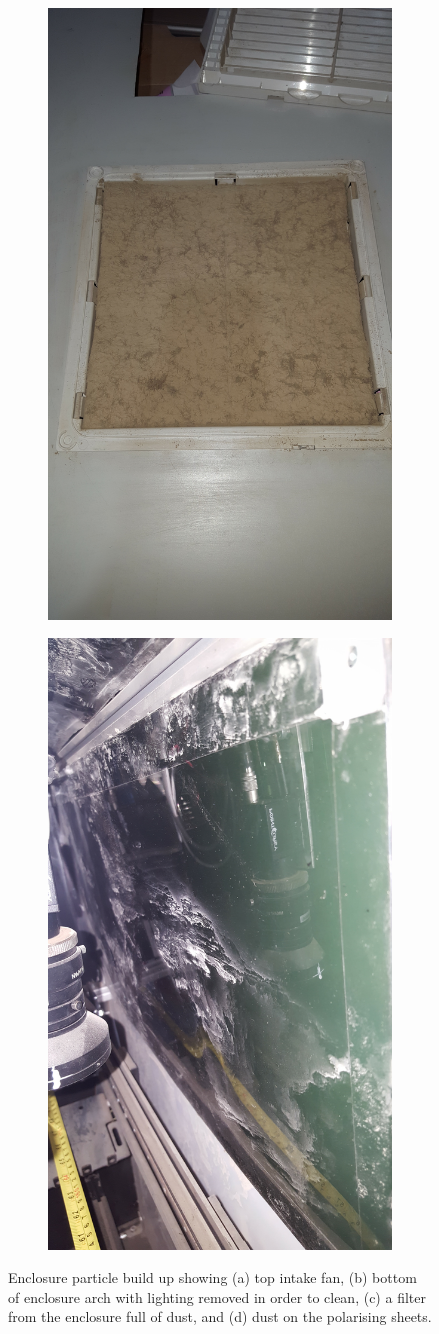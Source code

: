 \documentclass[fleqn,twoside,12pt]{report}
\begin{document}
\begin{figure}[ht]
\begin{subfigure}{.25\textwidth}
		\caption{}
		\label{fig:dirt_2}
	\end{subfigure}%
	\begin{subfigure}{.25\textwidth}
		\centering
		\includegraphics[height=0.9\linewidth,angle=270]{dirt_3.jpg}
		\caption{}
		\label{fig:dirt_3}
	\end{subfigure}%
	\begin{subfigure}{.25\textwidth}
		\centering
		\includegraphics[height=0.9\linewidth,angle=270]{dirt_4.jpg}
		\caption{}
		\label{fig:dirt_4}
	\end{subfigure}%
	
	\caption{Enclosure particle build up showing (a) top intake fan, (b) bottom of enclosure arch with lighting removed in order to clean, (c) a filter from the enclosure full of dust, and (d) dust on the polarising sheets.}
	\label{fig:dirty_enclosure}
\end{figure}
\end{document}

